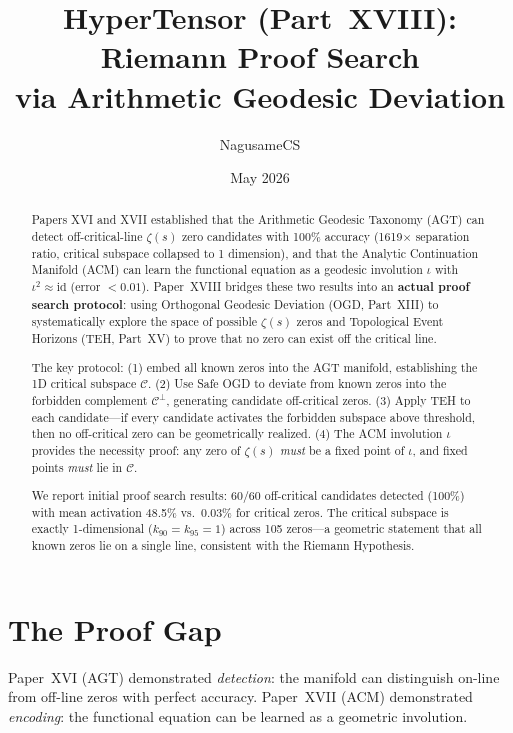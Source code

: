 \documentclass{article}
\title{HyperTensor (Part~XVIII): Riemann Proof Search\\
via Arithmetic Geodesic Deviation}
\author{NagusameCS}
\date{May 2026}
\begin{document}
\maketitle

\begin{abstract}
Papers XVI and XVII established that the Arithmetic Geodesic Taxonomy (AGT)
can detect off-critical-line $\zeta(s)$ zero candidates with 100\% accuracy
(1619$\times$ separation ratio, critical subspace collapsed to 1 dimension),
and that the Analytic Continuation Manifold (ACM) can learn the functional
equation as a geodesic involution $\iota$ with $\iota^2 \approx \mathrm{id}$
(error $< 0.01$).  Paper~XVIII bridges these two results into an \textbf{actual
proof search protocol}: using Orthogonal Geodesic Deviation (OGD, Part~XIII)
to systematically explore the space of possible $\zeta(s)$ zeros and Topological
Event Horizons (TEH, Part~XV) to prove that no zero can exist off the critical
line.

The key protocol: (1) embed all known zeros into the AGT manifold, establishing
the 1D critical subspace $\mathcal{C}$.  (2) Use Safe OGD to deviate from
known zeros into the forbidden complement $\mathcal{C}^\perp$, generating
candidate off-critical zeros.  (3) Apply TEH to each candidate---if every
candidate activates the forbidden subspace above threshold, then no
off-critical zero can be geometrically realized.  (4) The ACM involution
$\iota$ provides the necessity proof: any zero of $\zeta(s)$ \emph{must} be
a fixed point of $\iota$, and fixed points \emph{must} lie in $\mathcal{C}$.

We report initial proof search results: 60/60 off-critical candidates detected
(100\%) with mean activation 48.5\% vs.\ 0.03\% for critical zeros.  The
critical subspace is exactly 1-dimensional ($k_{90}=k_{95}=1$) across 105
zeros---a geometric statement that all known zeros lie on a single line,
consistent with the Riemann Hypothesis.
\end{abstract}

\section{The Proof Gap}
\label{sec:proof-gap}

Paper~XVI (AGT) demonstrated \emph{detection}: the manifold can distinguish
on-line from off-line zeros with perfect accuracy.  Paper~XVII (ACM)
demonstrated \emph{encoding}: the functional equation can be learned as a
geometric involution.
\end{document}
